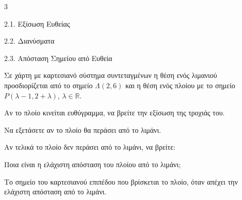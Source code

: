 \begin{ylh}{3}
    \item 2.1. Εξίσωση Ευθείας
    \item 2.2. Διανύσματα
    \item 2.3. Απόσταση Σημείου από Ευθεία
\end{ylh}
Σε χάρτη με καρτεσιανό σύστημα συντεταγμένων η θέση ενός λιμανιού προσδιορίζεται από το σημείο $\Lambda(2,6)$ και η θέση ενός πλοίου με το σημείο $P(\lambda-1, 2+\lambda)$, $\lambda \in \mathbb{R}$.
\begin{alist}
\item
    \begin{rlist}
    \item Αν το πλοίο κινείται ευθύγραμμα, να βρείτε την εξίσωση της τροχιάς του. 
    \item Να εξετάσετε αν το πλοίο θα περάσει από το λιμάνι. 
    \end{rlist}
\item Αν τελικά το πλοίο δεν περάσει από το λιμάνι, να βρείτε:
    \begin{rlist}
    \item Ποια είναι η ελάχιστη απόσταση του πλοίου από το λιμάνι; 
    \item Το σημείο του καρτεσιανού επιπέδου που βρίσκεται το πλοίο, όταν απέχει την ελάχιστη απόσταση από το λιμάνι. 
    \end{rlist}
\end{alist}